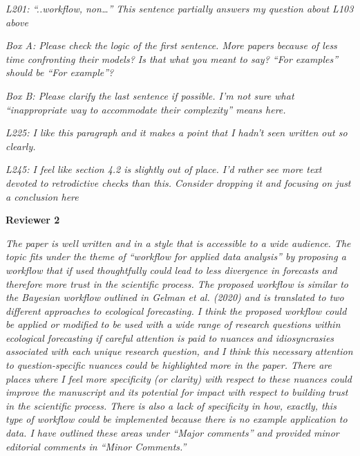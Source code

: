 \documentclass[11pt,letter]{article}
\begin{document}
\begin{mybox}
\emph{L201: “..workflow, non…” This sentence partially answers my question about L103 above}
\end{mybox}

\begin{mybox}
\emph{Box A: Please check the logic of the first sentence. More papers because of less time confronting their models? Is that what you meant to say? “For examples” should be “For example”?}
\end{mybox} 

\begin{mybox}
\emph{Box B: Please clarify the last sentence if possible. I’m not sure what “inappropriate way to accommodate their complexity” means here.}
\end{mybox}

\begin{mybox}
\emph{L225: I like this paragraph and it makes a point that I hadn’t seen written out so clearly.}
\end{mybox}

\begin{mybox}
\emph{L245: I feel like section 4.2 is slightly out of place. I’d rather see more text devoted to retrodictive checks than this. Consider dropping it and focusing on just a conclusion here}
\end{mybox}

{\bf Reviewer 2}

\begin{mybox}
\emph{The paper is well written and in a style that is accessible to a wide audience. The topic fits under the theme of “workflow for applied data analysis” by proposing a workflow that if used thoughtfully could lead to less divergence in forecasts and therefore more trust in the scientific process. The proposed workflow is similar to the Bayesian workflow outlined in Gelman et al. (2020) and is translated to two different approaches to ecological forecasting. I think the proposed workflow could be applied or modified to be used with a wide range of research questions within ecological forecasting if careful attention is paid to nuances and idiosyncrasies associated with each unique research question, and I think this necessary attention to question-specific nuances could be highlighted more in the paper. There are places where I feel more specificity (or clarity) with respect to these nuances could improve the manuscript and its potential for impact with respect to building trust in the scientific process. There is also a lack of specificity in how, exactly, this type of workflow could be implemented because there
is no example application to data. I have outlined these areas under “Major comments” and provided minor editorial comments in “Minor Comments.”}
\end{mybox}
\end{document}
